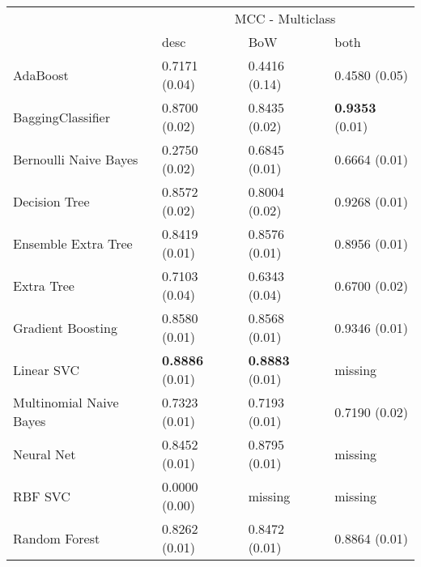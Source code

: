 \begin{tabular}{|l|l|l|l| }
\hline
 &  \multicolumn{3}{c|}{ MCC - Multiclass} \\
\cline{2-4} & desc & BoW & both \\ \hline
AdaBoost                & 0.7171 (0.04) & 0.4416 (0.14) & 0.4580 (0.05)\\
BaggingClassifier       & 0.8700 (0.02) & 0.8435 (0.02) & {\bf 0.9353} (0.01)\\
Bernoulli Naive Bayes   & 0.2750 (0.02) & 0.6845 (0.01) & 0.6664 (0.01)\\
Decision Tree           & 0.8572 (0.02) & 0.8004 (0.02) & 0.9268 (0.01)\\
Ensemble Extra Tree     & 0.8419 (0.01) & 0.8576 (0.01) & 0.8956 (0.01)\\
Extra Tree              & 0.7103 (0.04) & 0.6343 (0.04) & 0.6700 (0.02)\\
Gradient Boosting       & 0.8580 (0.01) & 0.8568 (0.01) & 0.9346 (0.01)\\
Linear SVC              & {\bf 0.8886} (0.01) & {\bf 0.8883} (0.01) & missing \\
Multinomial Naive Bayes & 0.7323 (0.01) & 0.7193 (0.01) & 0.7190 (0.02)\\
Neural Net              & 0.8452 (0.01) & 0.8795 (0.01) & missing \\
RBF SVC                 & 0.0000 (0.00) & missing  & missing \\
Random Forest           & 0.8262 (0.01) & 0.8472 (0.01) & 0.8864 (0.01)\\
\hline
\end{tabular}